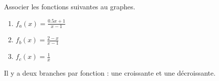 
\begin{exercice}\label{exosmath-0334}

    Associer les fonctions suivantes au graphes.

\begin{center}
   
\end{center}

\let\Oldtheenumi\theenumi
\renewcommand{\theenumi}{(\alph{enumi})}
\begin{multicols}{2}
    \begin{enumerate}
        \item
            \( f_a(x)=\frac{ 0.5x+1 }{ x-1 }\)
        \item
            \( f_b(x)=\frac{2-x}{ x-1 }\)
        \item
            \( f_c(x)=\frac{ 1 }{ x }\)
    \end{enumerate}
\end{multicols}
\let\theenumi\Oldtheenumi
Il y a deux branches par fonction : une croissante et une décroissante.

\end{exercice}
